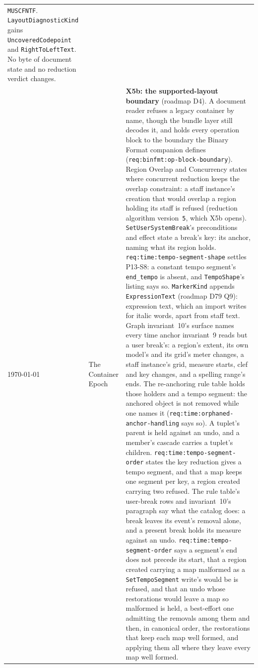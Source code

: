 \documentclass[11pt,letterpaper]{report}
\newcommand{\sectionsc}[1]{{\addfontfeatures{Letters=SmallCaps}#1}}
\begin{document}
\begin{longtable}{p{2cm} p{2.5cm} p{9cm}}
  \texttt{MUSCFNTF}. \texttt{LayoutDiagnosticKind} gains
  \texttt{UncoveredCodepoint} and \texttt{RightToLeftText}. No byte of
  document state and no reduction verdict changes.
  \\
  \today & \sectionsc{The Container Epoch} &
  \textbf{X5b: the supported-layout boundary} (roadmap D4). A document
  reader refuses a legacy container by name, though the bundle layer still
  decodes it, and holds every operation block to the boundary the Binary
  Format companion defines (\texttt{req:binfmt:op-block-boundary}).
  \sectionsc{Region Overlap and Concurrency} states where concurrent
  reduction keeps the overlap constraint: a staff instance's creation that
  would overlap a region holding its staff is refused (reduction algorithm
  version~\texttt{5}, which X5b opens). \texttt{SetUserSystemBreak}'s
  preconditions and effect state a break's key: its anchor, naming what its
  region holds. \texttt{req:time:tempo-segment-shape} settles P13-S8: a
  constant tempo segment's \texttt{end\_tempo} is absent, and
  \texttt{TempoShape}'s listing says so. \texttt{MarkerKind} appends
  \texttt{ExpressionText} (roadmap D79 Q9): expression text, which an import
  writes for italic words, apart from staff text. Graph invariant~10's
  surface names every time anchor invariant~9 reads but a user break's:
  a region's extent, its own model's and its grid's meter changes, a staff
  instance's grid, measure starts, clef and key changes, and a spelling
  range's ends. The re-anchoring rule table holds those holders and a tempo
  segment: the anchored object is not removed while one names it
  (\texttt{req:time:orphaned-anchor-handling} says so). A tuplet's parent is
  held against an undo, and a member's cascade carries a tuplet's children.
  \texttt{req:time:tempo-segment-order} states the key reduction gives a
  tempo segment, and that a map keeps one segment per key, a region created
  carrying two refused. The rule table's user-break rows and invariant~10's
  paragraph say what the catalog does: a break leaves its event's removal
  alone, and a present break holds its measure against an undo.
  \texttt{req:time:tempo-segment-order} says a segment's end does not
  precede its start, that a region created carrying a map malformed as a
  \texttt{SetTempoSegment} write's would be is refused, and that an undo
  whose restorations would leave a map so malformed is held, a best-effort
  one admitting the removals among them and then, in canonical order, the
  restorations that keep each map well formed, and applying them all where
  they leave every map well formed.
  \\
  \bottomrule
\end{longtable}
\end{document}
